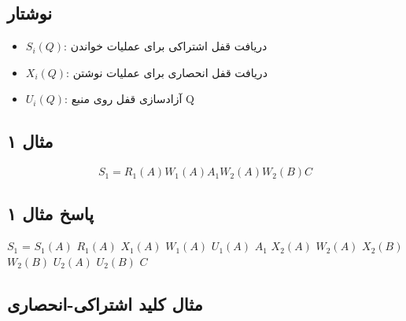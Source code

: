 \documentclass[a4paper]{article}
\begin{document}
\subsection*{نوشتار}

\begin{itemize}
    \item $S_i(Q)$: دریافت قفل اشتراکی برای عملیات خواندن
    \item $X_i(Q)$: دریافت قفل انحصاری برای عملیات نوشتن
    \item $U_i(Q)$: آزادسازی قفل روی منبع Q
\end{itemize}

\subsection*{مثال ۱}

\begin{equation}
    S_{1} = R_{1}(A) W_{1}(A) A_{1} W_{2}(A) W_{2}(B) C
\end{equation}

\subsection*{پاسخ مثال ۱}

\begin{LTR}
    \centering
    $S_{1}$ = $S_{1}(A)$ $R_{1}(A)$ $X_{1}(A)$ $W_{1}(A)$ $U_{1}(A)$ $A_{1}$ $X_{2}(A)$ $W_{2}(A)$ $X_{2}(B)$ $W_{2}(B)$ $U_{2}(A)$ $U_{2}(B)$ $C$
\end{LTR}

\subsection*{مثال کلید اشتراکی-انحصاری}

\begin{LTR}
    \begin{table}[h]
        \centering
    \end{table}
\end{LTR}
\end{document}
